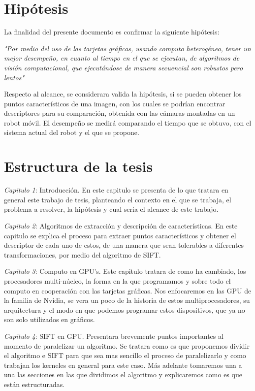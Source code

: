 \section{Hipótesis} 

La finalidad del presente documento es  confirmar la siguiente hipótesis:

\begin{center}
\textit{"Por medio del uso de las tarjetas gráficas, usando computo heterogéneo, tener un mejor desempeño, en cuanto al tiempo en el que se ejecutan, de algoritmos de visión computacional, que ejecutándose de manera secuencial son robustos pero lentos"}

\end{center}

Respecto al alcance, se considerara valida la hipótesis, si se pueden obtener los puntos característicos de una imagen, con los cuales se podrían encontrar descriptores para su comparación, obtenida con las cámaras montadas en un robot móvil. El desempeño se medirá comparando el tiempo que se obtuvo, con el sistema actual del robot y el que se propone.  

\section{Estructura de la tesis}

\textit{Capitulo 1}: Introducción. En este capitulo se presenta de lo que tratara en general este trabajo de tesis, planteando el contexto en el que se trabaja, el problema a resolver, la hipótesis y cual seria el alcance de este trabajo.

\textit{Capitulo 2}: Algoritmos de extracción y descripción de características. En este capitulo se explica el proceso para extraer puntos característicos y obtener el descriptor de cada uno de estos, de una manera que sean tolerables a diferentes transformaciones, por medio del algoritmo de SIFT.


\textit{Capitulo 3}: Computo en GPU's.  Este capitulo tratara de como ha cambiado, los procesadores multi-núcleo, la forma en la que programamos y sobre todo el computo en cooperación con las tarjetas gráficas. Nos enfocaremos en las GPU de la familia de Nvidia, se vera un poco de la historia de estos multiprocesadores, su arquitectura y el modo en que podemos programar estos dispositivos, que ya no son solo utilizados en gráficos.



\textit{Capitulo 4}: SIFT en GPU. Presentara brevemente puntos importantes al momento de paralelizar un algoritmo.
Se tratara como es que proponemos dividir el algoritmo e SIFT para que sea mas sencillo el proceso de paralelizarlo y como trabajan los kerneles en general para este caso.
Más adelante tomaremos una a una las secciones en las que dividimos el algoritmo y explicaremos como es que están estructuradas.


